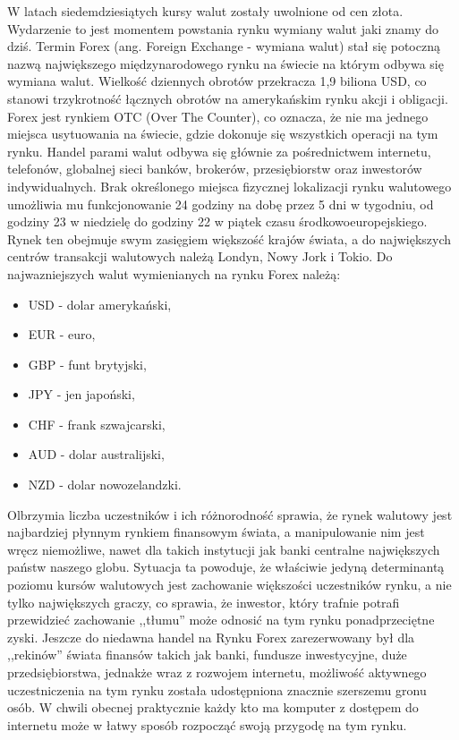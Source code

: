 \documentclass[pdflatex,11pt]{aghdpl}
\begin{document}
W latach siedemdziesiątych kursy walut zostały uwolnione od cen złota. Wydarzenie to jest momentem powstania rynku wymiany walut jaki znamy do dziś. Termin Forex (ang. Foreign Exchange - wymiana walut) stał się potoczną nazwą największego międzynarodowego rynku na świecie na którym odbywa się wymiana walut. Wielkość dziennych obrotów przekracza 1,9 biliona USD, co stanowi trzykrotność łącznych obrotów na amerykańskim rynku akcji i obligacji. Forex jest rynkiem OTC (Over The Counter), co oznacza, że nie ma jednego miejsca usytuowania na świecie, gdzie dokonuje się wszystkich operacji na tym rynku. Handel parami walut odbywa się głównie za pośrednictwem internetu, telefonów, globalnej sieci banków, brokerów, przesiębiorstw oraz inwestorów indywidualnych. Brak określonego miejsca fizycznej lokalizacji rynku walutowego umożliwia mu funkcjonowanie 24 godziny na dobę przez 5 dni w tygodniu, od godziny 23 w niedzielę do godziny 22 w piątek czasu środkowoeuropejskiego. Rynek ten obejmuje swym zasięgiem większość krajów świata, a do największych centrów transakcji walutowych należą Londyn, Nowy Jork i Tokio. Do najwazniejszych walut wymienianych na rynku Forex należą:
\begin{itemize}
\item USD - dolar amerykański,
\item EUR - euro,
\item GBP - funt brytyjski,
\item JPY - jen japoński,
\item CHF - frank szwajcarski,
\item AUD - dolar australijski,
\item NZD - dolar nowozelandzki.
\end{itemize}

Olbrzymia liczba uczestników i ich różnorodność sprawia, że rynek walutowy jest najbardziej płynnym rynkiem finansowym świata, a manipulowanie nim jest wręcz niemożliwe, nawet dla takich instytucji jak banki centralne największych państw naszego globu. Sytuacja ta powoduje, że właściwie jedyną determinantą poziomu kursów walutowych jest zachowanie większości uczestników rynku, a nie tylko największych graczy, co sprawia, że inwestor, który trafnie potrafi przewidzieć zachowanie ,,tłumu'' może odnosić na tym rynku ponadprzeciętne zyski.
Jeszcze do niedawna handel na Rynku Forex zarezerwowany był dla ,,rekinów'' świata finansów takich jak banki, fundusze inwestycyjne, duże przedsiębiorstwa, jednakże wraz z rozwojem internetu, możliwość aktywnego uczestniczenia na tym rynku została udostępniona znacznie szerszemu gronu osób. W chwili obecnej praktycznie każdy kto ma komputer z dostępem do internetu może w łatwy sposób rozpocząć swoją przygodę na tym rynku.
\end{document}
